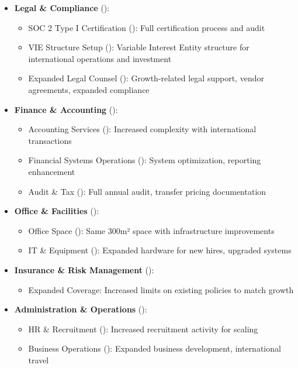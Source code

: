 \documentclass[11pt, a4paper, oneside]{article}
\begin{document}
\begin{itemize}
    \item \textbf{Legal \& Compliance} ():
    \begin{itemize}
        \item SOC 2 Type I Certification (): Full certification process and audit
        \item VIE Structure Setup (): Variable Interest Entity structure for international operations and investment
        \item Expanded Legal Counsel (): Growth-related legal support, vendor agreements, expanded compliance
    \end{itemize}
    
    \item \textbf{Finance \& Accounting} ():
    \begin{itemize}
        \item Accounting Services (): Increased complexity with international transactions
        \item Financial Systems Operations (): System optimization, reporting enhancement
        \item Audit \& Tax (): Full annual audit, transfer pricing documentation
    \end{itemize}
    
    \item \textbf{Office \& Facilities} ():
    \begin{itemize}
        \item Office Space (): Same 300m² space with infrastructure improvements
        \item IT \& Equipment (): Expanded hardware for new hires, upgraded systems
    \end{itemize}
    
    \item \textbf{Insurance \& Risk Management} ():
    \begin{itemize}
        \item Expanded Coverage: Increased limits on existing policies to match growth
    \end{itemize}
    
    \item \textbf{Administration \& Operations} ():
    \begin{itemize}
        \item HR \& Recruitment (): Increased recruitment activity for scaling
        \item Business Operations (): Expanded business development, international travel
    \end{itemize}
\end{itemize}
\end{document}
